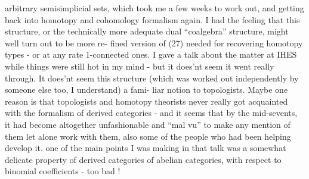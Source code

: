 arbitrary semisimplicial sets,  which took me a few weeks to work out,
and  getting back into homotopy and cohomology formalism again.  I had
the feeling that this structure,  or the technically more adequate
dual  ``coalgebra'' structure,  might well turn out to be  more re-%
fined version of (27)  needed for recovering homotopy types - 
or at any rate 1-connected ones.  I gave a talk about the matter at
IHES while things were still hot in my mind  -  but it does'nt seem
it went really through.   It does'nt seem this structure (which was
worked out independently by someone else too,  I understand)   a fami-%
liar notion to topologists.  Maybe one reason is that  topologists 
and homotopy theorists never really got acquainted with the formalism
of derived categories  -  and it seems that  by the mid-sevents,  it
had  become altogether unfashionable and ``mal vu'' to make any mention of
them let alone work with them,   also   some of the people who
 had been helping  develop it.   one of the main
points I was making in that talk was a somewhat delicate property of
derived categories of abelian categories,  with respect to binomial
coefficients  -  too bad !

